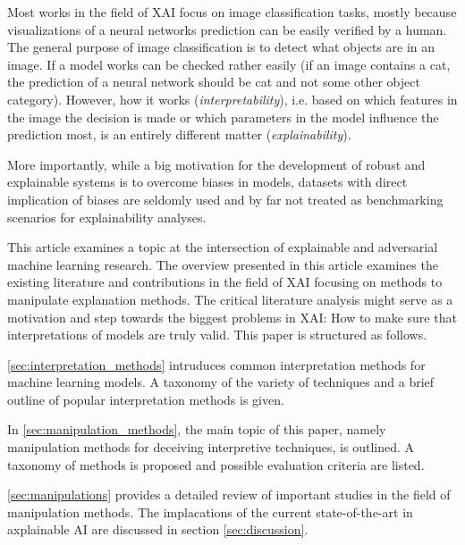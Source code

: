Most works in the field of XAI focus on image classification tasks, mostly because visualizations of a neural networks prediction can be easily verified by a human. The general purpose of image classification is to detect what objects are in an image. If a model works can be checked rather easily (if an image contains a cat, the prediction of a neural network should be cat and not some other object category). However, how it works (\textit{interpretability}), i.e. based on which features in the image the decision is made or which parameters in the model influence the prediction most, is an entirely different matter (\textit{explainability}).  


More importantly, while a big motivation for the development of robust and explainable systems is to overcome biases in models, datasets with direct implication of biases are seldomly used and by far not treated as benchmarking scenarios for explainability analyses.  






This article examines a topic at the intersection of explainable and adversarial machine learning research. 
The overview presented in this article examines the existing literature and contributions in the field of XAI focusing on methods to manipulate explanation methods.  
The critical literature analysis might serve as a motivation and step towards the biggest problems in XAI: How to make sure that interpretations of models are truly valid. 
This paper is structured as follows.

\autoref{sec:interpretation_methods} intruduces common interpretation methods for machine learning models. A taxonomy of the variety of techniques and a brief outline of popular interpretation methods is given. 

In \autoref{sec:manipulation_methods}, the main topic of this paper, namely manipulation methods for deceiving interpretive techniques, is outlined. A taxonomy of methods is proposed and possible evaluation criteria are listed.

\autoref{sec:manipulations} provides a detailed review of important studies in the field of manipulation methods. The implacations of the current state-of-the-art in axplainable AI are discussed in section \autoref{sec:discussion}.